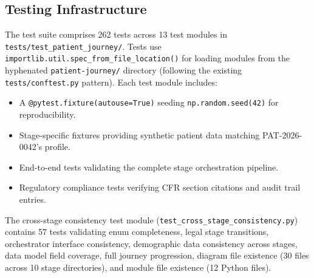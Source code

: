 \documentclass{article}
\begin{document}
\subsection{Testing Infrastructure}

The test suite comprises 262 tests across 13 test modules in \texttt{tests/test\_patient\_journey/}. Tests use \texttt{importlib.util.spec\_from\_file\_location()} for loading modules from the hyphenated \texttt{patient-journey/} directory (following the existing \texttt{tests/conftest.py} pattern). Each test module includes:

\begin{itemize}[leftmargin=*]
\item A \texttt{@pytest.fixture(autouse=True)} seeding \texttt{np.random.seed(42)} for reproducibility.
\item Stage-specific fixtures providing synthetic patient data matching PAT-2026-0042's profile.
\item End-to-end tests validating the complete stage orchestration pipeline.
\item Regulatory compliance tests verifying CFR section citations and audit trail entries.
\end{itemize}

The cross-stage consistency test module (\texttt{test\_cross\_stage\_consistency.py}) contains 57 tests validating enum completeness, legal stage transitions, orchestrator interface consistency, demographic data consistency across stages, data model field coverage, full journey progression, diagram file existence (30 files across 10 stage directories), and module file existence (12 Python files).
\end{document}
